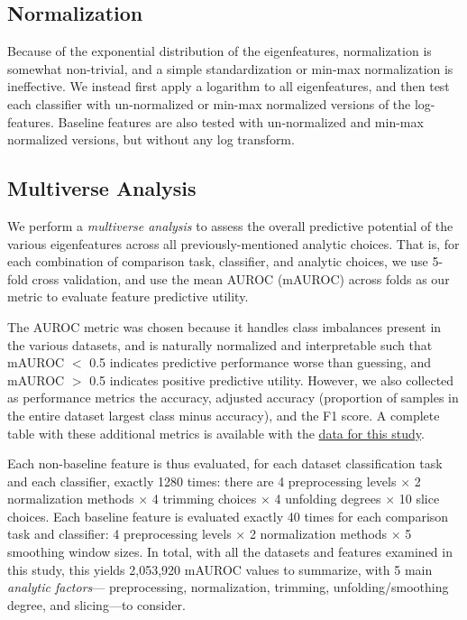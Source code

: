 \documentclass[12pt]{spieman}  %
\begin{document}
\begin{spacing}{2}
\subsection{Normalization}

Because of the exponential distribution of the eigenfeatures, normalization is
somewhat non-trivial, and a simple standardization or min-max normalization is
ineffective. We instead first apply a logarithm to all eigenfeatures, and then
test each classifier with un-normalized or min-max normalized versions of the
log-features. Baseline features are also tested with un-normalized and min-max
normalized versions, but without any log transform.


\subsection{Multiverse Analysis}
\label{sec:multiverse}

We perform a \textit{multiverse
analysis}\cite{steegenIncreasingTransparencyMultiverse2016} to assess the
overall predictive potential of the various eigenfeatures across all
previously-mentioned analytic choices. That is, for each combination of
comparison task, classifier, and analytic choices, we use 5-fold cross
validation, and use the mean AUROC (mAUROC) across folds as our metric to
evaluate feature predictive utility.

The AUROC metric was chosen because it handles class imbalances present in the
various datasets, and is naturally normalized and interpretable such that
mAUROC \(<\) 0.5 indicates predictive performance worse than guessing, and
mAUROC \(>\) 0.5 indicates positive predictive
utility\cite{mandrekarReceiverOperatingCharacteristic2010}. However, we also
collected as performance metrics the accuracy, adjusted accuracy (proportion of
samples in the entire dataset largest class minus accuracy), and the F1 score.
A complete table with these additional metrics is available with the
\hyperref[sec:data-and-code]{data for this study}.

Each non-baseline feature is thus evaluated, for each dataset classification
task and each classifier, exactly 1280 times: there are 4 preprocessing levels
\(\times\) 2 normalization methods \(\times\) 4 trimming choices \(\times\) 4
unfolding degrees  \(\times\) 10 slice choices. Each baseline feature is
evaluated exactly 40 times for each comparison task and classifier: 4
preprocessing levels \(\times\) 2 normalization methods \(\times\) 5 smoothing
window sizes. In total, with all the datasets and features examined in this
study, this yields 2,053,920 mAUROC values to summarize, with 5 main
\textit{analytic factors}— preprocessing, normalization, trimming,
unfolding/smoothing degree, and slicing—to consider.




\end{spacing}
\end{document}
